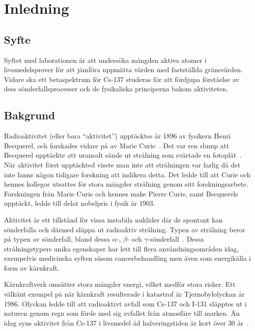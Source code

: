 \section{Inledning} \label{sec:introduction}

\subsection{Syfte} \label{sec:purpose}

Syftet med laborationen är att undersöka mängden aktiva atomer i
livsmedelsprover för att jämföra uppmätta värden med fastställda gränsvärden.
Vidare ska ett betaspektrum för Cs-137 studeras för att fördjupa förståelse
av dess sönderfallsprocesser och de fysikaliska principerna bakom aktiviteten.

\subsection{Bakgrund} \label{sec:background}

Radioaktivitet (eller bara ``aktivitet'') upptäcktes år 1896 av fysikern
Henri Becquerel, och forskades vidare på av Marie Curie~\parencite{curie}. Det
var ren slump att Becquerel upptäckte att uransalt sände ut strålning som
svärtade en fotoplåt~\parencite{milestones}. När aktivitet först upptäckted
visste man inte att strålningen var farlig då det inte fanns någon tidigare
forskning att indikera detta. Det ledde till att Curie och hennes kollegor
utsattes för stora mängder strålning genom sitt forskningsarbete. Forskningen
från Marie Curie och hennes make Pierre Curie, samt Becquerels upptäckt, ledde
till delat nobelpris i fysik år 1903.

Aktivitet är ett tillstånd för vissa instabila nuklider där de spontant kan
sönderfalla och därmed släppa ut radioaktiv strålning. Typen av strålning beror
på typen av sönderfall, bland dessa $\alpha$-, $\beta$- och
$\gamma$-sönderfall~\parencite{arpansa}. Dessa strålningstypers unika
egenskaper har lett till flera användningsområden idag, exempelvis medicinska
syften såsom cancerbehandling men även som energikälla i form av kärnkraft.

Kärnkraftverk omsätter stora mängder energi, vilket medför stora risker. Ett
välkänt exempel på när kärnkraft resulterade i katastrof är Tjernobylolyckan år
1986. Olyckan ledde till att radioaktivt avfall som Cs-137 och I-131 släpptes
ut i naturen genom regn som förde med sig avfallet från atmosfäre till marken.
Än idag syns aktivitet från Cs-137 i livsmedel åd halveringstiden är kort
över 30 år~\parencite{fysika}.

